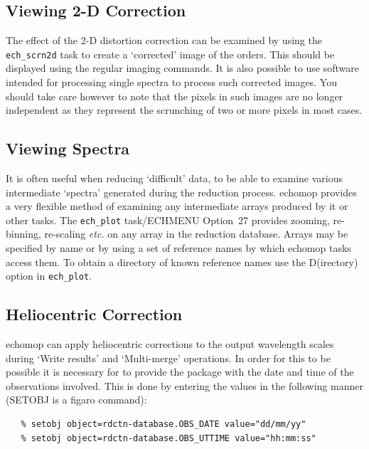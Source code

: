 \documentclass[11pt,twoside]{article}
\makeatletter
\newcommand{\htmlref}[2]{#1}
\newcommand{\xref}[3]{#1}
\newcommand{\xlabel}[1]{}
\newcommand{\mlabel}[1]{\xlabel{#1}\label{#1}}
\newcommand{\myindex}[1]{\index{#1}}
\newcommand{\indexcmdname}[1]{\index{#1@\protect\cmdname{#1}}}
\renewcommand{\myindex}[1]{}
\renewcommand{\indexcmdname}[1]{}
\newcommand{\cmdname}{\begingroup \catcode`\_=12 \realcmdname}
\newcommand{\realcmdname}[1]{\endgroup\texttt{#1}}
\makeatother
\begin{document}
\subsection{\mlabel{viewing_2D_corr}Viewing 2-D Correction}
\myindex{2-D distortion!viewing}

The effect of the 2-D distortion correction can be examined by using
the \texttt{ech\_scrn2d} task to create a `corrected' image of the
orders.
This should be displayed using the regular imaging commands.  It is
also possible to use software intended for processing single spectra
to process such corrected images.  You should take care
however to note that the pixels in such images are no longer
independent as they represent the scrunching of two or more pixels in
most cases. \indexcmdname{ECH_SCRN2D}


\subsection{\mlabel{viewing_spectra}Viewing Spectra}
\myindex{Viewing spectra}
\myindex{Trouble-shooting}

It is often useful when reducing `difficult' data,  to be able to
examine various intermediate `spectra' generated during the reduction
process. {\sc echomop} provides a very flexible method of examining any
intermediate arrays produced by it or other tasks.  The
\htmlref{{\tt ech\_plot} task/ECHMENU Option~27}{ech_plot}
provides zooming, re-binning, re-scaling {\it etc.}
on any array in the reduction database.  Arrays may be specified by
name or by using a set of reference names by which {\sc echomop} tasks access
them.  \indexcmdname{ECH_PLOT} To obtain a directory of known reference names
use the D(irectory) option in \texttt{ech\_plot}\@.


\subsection{\mlabel{heliocentric_corr}Heliocentric Correction}
\myindex{Heliocentric correction}

{\sc echomop} can apply heliocentric corrections to the output wavelength scales
during `Write results' and `Multi-merge' operations.
In order for this to be possible it is necessary for to provide the package
with the date and time of the observations involved.
This is done by entering the values in the
following manner (\xref{SETOBJ}{sun86}{SETOBJ} is a
\xref{{\sc figaro}}{sun86}{} command):

\begin{verbatim}
   % setobj object=rdctn-database.OBS_DATE value="dd/mm/yy"
   % setobj object=rdctn-database.OBS_UTTIME value="hh:mm:ss"
\end{verbatim}
\end{document}
